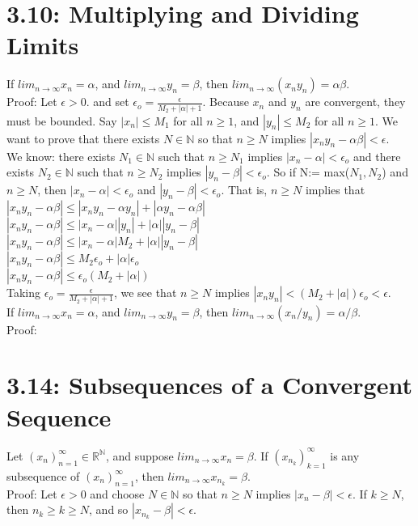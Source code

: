 \documentclass[10pt,letter]{report}
\begin{document}
\section*{3.10: Multiplying and Dividing Limits}
If $lim_{n\rightarrow\infty}x_n = \alpha$, and $lim_{n\rightarrow\infty}y_n = \beta$, then $lim_{n\rightarrow\infty}(x_ny_n) = \alpha\beta$.\\
Proof: Let $\epsilon > 0$. and set $\epsilon_o = \frac{\epsilon}{M_2 +|\alpha| + 1}$. Because $x_n$ and $y_n$ are convergent, they must be bounded. Say $|x_n| \leq M_1$ for all $n \geq 1$, and $|y_n| \leq M_2$ for all $n \geq 1$. We want to prove that there exists $N \in \mathbb{N}$ so that $n \geq N$ implies $|x_ny_n - \alpha\beta| < \epsilon$.\\ 
We know: there exists $N_1 \in \mathbb{N}$ such that $n \geq N_1$ implies $|x_n - \alpha| < \epsilon_o$ and there exists $N_2 \in \mathbb{N}$ such that $n \geq N_2$ implies $|y_n - \beta| < \epsilon_o$. So if N:= max($N_1,N_2$) and $n \geq N$, then $|x_n - \alpha| < \epsilon_o$ and $|y_n - \beta| < \epsilon_o$. That is, $n \geq N$ implies that \\ 
$|x_ny_n - \alpha\beta| \leq |x_ny_n - \alpha y_n| + |\alpha y_n - \alpha\beta|$ \\ 
$|x_ny_n - \alpha\beta| \leq |x_n - \alpha||y_n| + |\alpha||y_n - \beta|$ \\ 
$|x_ny_n - \alpha\beta| \leq |x_n - \alpha|M_2 + |\alpha||y_n - \beta|$\\ 
$|x_ny_n - \alpha\beta| \leq M_2\epsilon_o + |\alpha|\epsilon_o$ \\ 
$|x_ny_n - \alpha\beta| \leq \epsilon_o(M_2 + |\alpha|)$ \\ 
Taking $\epsilon_o = \frac{\epsilon}{M_2 +|\alpha| + 1}$, we see that $n \geq N$ implies $|x_ny_n| < (M_2+|a|)\epsilon_o < \epsilon$. \\ 

If $lim_{n\rightarrow\infty}x_n = \alpha$, and $lim_{n\rightarrow\infty}y_n = \beta$, then $lim_{n\rightarrow\infty}(x_n/y_n) = \alpha/\beta$.\\ 
Proof: 


\section*{3.14: Subsequences of a Convergent Sequence}
Let $(x_n)_{n=1}^\infty \in \mathbb{R}^\mathbb{N}$, and suppose $lim_{n\rightarrow\infty}x_n = \beta$. If $(x_{n_k})_{k=1}^\infty$ is any subsequence of $(x_n)_{n=1}^\infty$, then $lim_{n\rightarrow\infty}x_{n_k} = \beta$.\\ 
Proof: Let $\epsilon > 0$ and choose $N \in \mathbb{N}$ so that $n \geq N$ implies $|x_n-\beta|<\epsilon$. If $k\geq N$, then $n_k\geq k\geq N$, and so $|x_{n_k}-\beta| < \epsilon$. 
\end{document}
